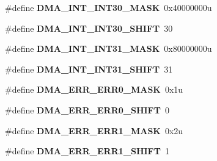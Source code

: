\begin{DoxyCompactItemize}
\item 
\hypertarget{group___d_m_a___register___masks_gac2429ec27d009beb0bbf38caae359195}{}\#define {\bfseries D\+M\+A\+\_\+\+I\+N\+T\+\_\+\+I\+N\+T30\+\_\+\+M\+A\+S\+K}~0x40000000u\label{group___d_m_a___register___masks_gac2429ec27d009beb0bbf38caae359195}

\item 
\hypertarget{group___d_m_a___register___masks_ga7b01c8d195c536d2854b4db876426f04}{}\#define {\bfseries D\+M\+A\+\_\+\+I\+N\+T\+\_\+\+I\+N\+T30\+\_\+\+S\+H\+I\+F\+T}~30\label{group___d_m_a___register___masks_ga7b01c8d195c536d2854b4db876426f04}

\item 
\hypertarget{group___d_m_a___register___masks_gad64ed0bdf0d1a72df798b4df39c08f57}{}\#define {\bfseries D\+M\+A\+\_\+\+I\+N\+T\+\_\+\+I\+N\+T31\+\_\+\+M\+A\+S\+K}~0x80000000u\label{group___d_m_a___register___masks_gad64ed0bdf0d1a72df798b4df39c08f57}

\item 
\hypertarget{group___d_m_a___register___masks_gaa11d37cc12a49c9c30f71f3d002f8cd7}{}\#define {\bfseries D\+M\+A\+\_\+\+I\+N\+T\+\_\+\+I\+N\+T31\+\_\+\+S\+H\+I\+F\+T}~31\label{group___d_m_a___register___masks_gaa11d37cc12a49c9c30f71f3d002f8cd7}

\item 
\hypertarget{group___d_m_a___register___masks_ga9101f17d9361d3e54fd4efdc051f9ec7}{}\#define {\bfseries D\+M\+A\+\_\+\+E\+R\+R\+\_\+\+E\+R\+R0\+\_\+\+M\+A\+S\+K}~0x1u\label{group___d_m_a___register___masks_ga9101f17d9361d3e54fd4efdc051f9ec7}

\item 
\hypertarget{group___d_m_a___register___masks_ga0b40ac186b1c6a1be5bf5497a901448a}{}\#define {\bfseries D\+M\+A\+\_\+\+E\+R\+R\+\_\+\+E\+R\+R0\+\_\+\+S\+H\+I\+F\+T}~0\label{group___d_m_a___register___masks_ga0b40ac186b1c6a1be5bf5497a901448a}

\item 
\hypertarget{group___d_m_a___register___masks_ga7499ec372d112f712c709c1a2e2abf86}{}\#define {\bfseries D\+M\+A\+\_\+\+E\+R\+R\+\_\+\+E\+R\+R1\+\_\+\+M\+A\+S\+K}~0x2u\label{group___d_m_a___register___masks_ga7499ec372d112f712c709c1a2e2abf86}

\item 
\hypertarget{group___d_m_a___register___masks_ga9f34d449d0ef98d8e06bcc52d8aef151}{}\#define {\bfseries D\+M\+A\+\_\+\+E\+R\+R\+\_\+\+E\+R\+R1\+\_\+\+S\+H\+I\+F\+T}~1\label{group___d_m_a___register___masks_ga9f34d449d0ef98d8e06bcc52d8aef151}


\end{DoxyCompactItemize}
